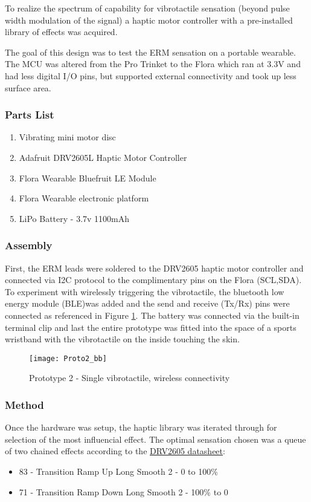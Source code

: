 To realize the spectrum of capability for vibrotactile sensation (beyond pulse width modulation of the signal) a haptic motor controller with a pre-installed library of effects was acquired. 

The goal of this design was to test the ERM sensation on a portable wearable. The MCU was altered from the Pro Trinket to the Flora which ran at 3.3V and had less digital I/O pins, but supported external connectivity and took up less surface area.

\subsubsection{Parts List}
\begin{enumerate}
    \item Vibrating mini motor disc
    \item Adafruit DRV2605L Haptic Motor Controller
    \item Flora Wearable Bluefruit LE Module
    \item Flora Wearable electronic platform
    \item LiPo Battery - 3.7v 1100mAh
\end{enumerate}
\subsubsection{Assembly}
    First, the ERM leads were soldered to the DRV2605 haptic motor controller and connected via I2C protocol to the complimentary pins on the Flora (SCL,SDA).
    To experiment with wirelessly triggering the vibrotactile, the bluetooth low energy module (BLE)was added and the send and receive (Tx/Rx) pins were connected as referenced in Figure \ref{Proto2}. The battery was connected via the built-in terminal clip and last the entire prototype was fitted into the space of a sports wristband with the vibrotactile on the inside touching the skin.

    \begin{figure}[H]
        \texttt{[image: Proto2\_bb]}
        \caption{Prototype 2 - Single vibrotactile, wireless connectivity}
        \label{Proto2}
    \end{figure}

\subsubsection{Method}
    Once the hardware was setup, the haptic library was iterated through for selection of the most influencial effect. The optimal sensation chosen was a queue of two chained effects according to the \underline{DRV2605 datasheet}:
    \begin{itemize}
        \item 83 - Transition Ramp Up Long Smooth 2 - 0 to 100\%
        \item 71 - Transition Ramp Down Long Smooth 2 - 100\% to 0
    \end{itemize}


